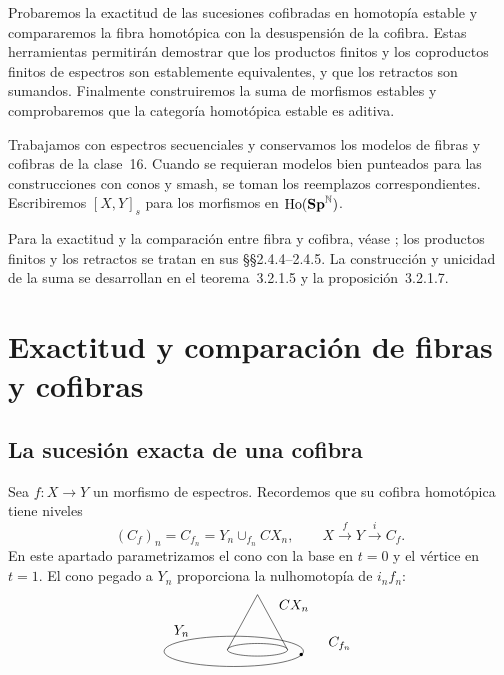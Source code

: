 
Probaremos la exactitud de las sucesiones cofibradas en homotopía estable y compararemos la fibra homotópica con la desuspensión de la cofibra. Estas herramientas permitirán demostrar que los productos finitos y los coproductos finitos de espectros son establemente equivalentes, y que los retractos son sumandos. Finalmente construiremos la suma de morfismos estables y comprobaremos que la categoría homotópica estable es aditiva.

Trabajamos con espectros secuenciales y conservamos los modelos de fibras y cofibras de la clase~16. Cuando se requieran modelos bien punteados para las construcciones con conos y smash, se toman los reemplazos correspondientes. Escribiremos $[X,Y]_s$ para los morfismos en $\operatorname{Ho}(\mathbf{Sp}^{\mathbb N})$.

Para la exactitud y la comparación entre fibra y cofibra, véase \cite[\S2.4.2, lemas~2.4.2.5--2.4.2.7]{malkiewich}; los productos finitos y los retractos se tratan en sus \S\S2.4.4--2.4.5. La construcción y unicidad de la suma se desarrollan en el teorema~3.2.1.5 y la proposición~3.2.1.7.

\section{Exactitud y comparación de fibras y cofibras}

\subsection{La sucesión exacta de una cofibra}

Sea $f\colon X\to Y$ un morfismo de espectros. Recordemos que su cofibra homotópica tiene niveles
\[
(C_f)_n=C_{f_n}=Y_n\cup_{f_n}CX_n,
\qquad
X\xrightarrow{f}Y\xrightarrow{i}C_f.
\]
En este apartado parametrizamos el cono con la base en $t=0$ y el vértice en $t=1$. El cono pegado a $Y_n$ proporciona la nulhomotopía de $i_nf_n$:
\[
\begin{tikzpicture}[scale=.8,baseline=(current bounding box.center)]
\draw (-2,0) ellipse (2.2 and .48);
\draw (-2.2,.05)--(-1.25,1.8)--(-.3,.05);
\draw (-1.25,.05) ellipse (.95 and .2);
\fill (.13,-.1) circle (1.5pt);
\node at (-3.65,.65) {$Y_n$};
\node at (-.1,1.45) {$CX_n$};
\node at (1.35,.25) {$C_{f_n}$};
\end{tikzpicture}
\]

